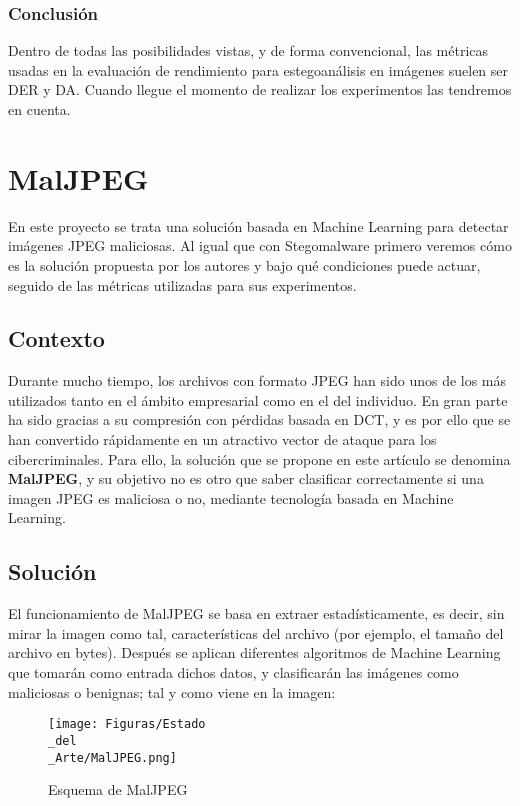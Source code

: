 \subsubsection{Conclusión}

Dentro de todas las posibilidades vistas, y de forma convencional, las métricas usadas en la evaluación de rendimiento para estegoanálisis en imágenes suelen ser \ac{DER} y \ac{DA}. Cuando llegue el momento de realizar los experimentos las tendremos en cuenta.

\section{MalJPEG}

En este proyecto se trata una solución basada en Machine Learning para detectar imágenes JPEG maliciosas. Al igual que con Stegomalware primero veremos cómo es la solución propuesta por los autores y bajo qué condiciones puede actuar, seguido de las métricas utilizadas para sus experimentos.

\subsection{Contexto}

Durante mucho tiempo, los archivos con formato JPEG han sido unos de los más utilizados tanto en el ámbito empresarial como en el del individuo. En gran parte ha sido gracias a su compresión con pérdidas basada en \ac{DCT}, y es por ello que se han convertido rápidamente en un atractivo vector de ataque para los cibercriminales. Para ello, la solución que se propone en este artículo se denomina \textbf{MalJPEG}, y su objetivo no es otro que saber clasificar correctamente si una imagen JPEG es maliciosa o no, mediante tecnología basada en Machine Learning.

\subsection{Solución}

El funcionamiento de MalJPEG se basa en extraer estadísticamente, es decir, sin mirar la imagen como tal, características del archivo (por ejemplo, el tamaño del archivo en bytes). Después se aplican diferentes algoritmos de Machine Learning que tomarán como entrada dichos datos, y clasificarán las imágenes como maliciosas o benignas; tal y como viene en la imagen:

\begin{figure}[H]
  \centering
  \texttt{[image: Figuras/Estado\\\_del\\\_Arte/MalJPEG.png]}
  \label{fig:MalJPEG}
  \caption{Esquema de MalJPEG}
\end{figure}

